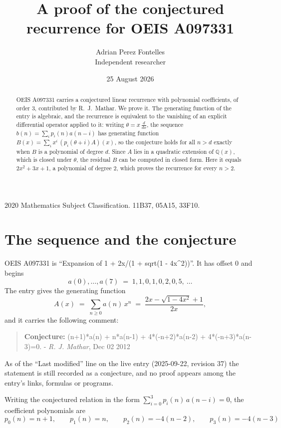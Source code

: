 \documentclass[11pt,a4paper]{article}
\title{A proof of the conjectured recurrence for OEIS A097331}
\author{Adrian Perez Fontelles\\ \small Independent researcher}
\date{25 August 2026}
\theoremstyle{plain}
\theoremstyle{definition}
\begin{document}
\maketitle

\begin{abstract}
OEIS A097331 carries a conjectured linear recurrence with polynomial coefficients, of
order 3, contributed by R.~J.~Mathar. We prove it. The generating function of the
entry is algebraic, and the recurrence is equivalent to the vanishing of an explicit
differential operator applied to it: writing $\theta=x\,\frac{d}{dx}$, the sequence
$b(n)=\sum_{i}p_{i}(n)a(n-i)$ has generating function
$B(x)=\sum_{i}x^{i}\,(p_{i}(\theta+i)A)(x)$, so the conjecture holds for all $n>d$ exactly
when $B$ is a polynomial of degree $d$. Since $A$ lies in a quadratic extension of
$\mathbb{Q}(x)$, which is closed under $\theta$, the residual $B$ can be computed in
closed form. Here it equals $2 x^{2} + 3 x + 1$, a polynomial of degree $2$, which proves
the recurrence for every $n>2$.
\end{abstract}

\noindent\small 2020 Mathematics Subject Classification. 11B37, 05A15, 33F10.\normalsize

\section{The sequence and the conjecture}

OEIS A097331 is ``Expansion of 1 + 2x/(1 + sqrt(1 - 4x\^{}2))''. It has offset $0$ and begins
\[
a(0),\dots,a(7)\;=\;1, 1, 0, 1, 0, 2, 0, 5,\ \dots
\]
The entry gives the generating function
\begin{equation}\label{eq:gf}
A(x)\;=\;\sum_{n\ge 0} a(n)\,x^{n}\;=\;\frac{2 x - \sqrt{1 - 4 x^{2}} + 1}{2 x} ,
\end{equation}
and it carries the following comment:
\begin{quote}\small
\textbf{Conjecture:} (n+1)*a(n) + n*a(n-1) + 4*(-n+2)*a(n-2) + 4*(-n+3)*a(n-3)=0. - \emph{R. J. Mathar}, Dec 02 2012
\end{quote}
As of the ``Last modified'' line on the live entry (2025-09-22, revision 37) the
statement is still recorded as a conjecture, and no proof appears among the entry's links,
formulas or programs.

Writing the conjectured relation in the form $\sum_{i=0}^{3}p_{i}(n)\,a(n-i)=0$,
the coefficient polynomials are
\[
p_{0}(n)=n + 1,\qquad p_{1}(n)=n,\qquad p_{2}(n)=- 4 \left(n - 2\right),\qquad p_{3}(n)=- 4 \left(n - 3\right)
\]
\end{document}
